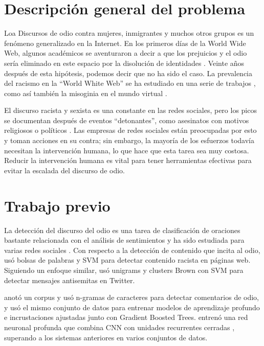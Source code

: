 \section{Descripción general del problema}

Loa Discursos de odio contra mujeres, inmigrantes y muchos otros grupos es un fenómeno generalizado en la Internet. En los primeros días de la World Wide Web, algunos académicos se aventuraron a decir a que los prejuicios y el odio sería eliminado en este espacio por la disolución de identidades \cite{levy2001cyberculture, rheingold1993virtual}. Veinte años después de esta hipótesis, podemos
decir que no ha sido el caso. La prevalencia del racismo en la ``World White Web'' se ha estudiado en una serie de trabajos \cite{adams2005white, kettrey2014staking}, como así también la misoginia en el mundo virtual \cite{filipovic2007blogging, mantilla2013gendertrolling}.

El discurso racista y sexista es una constante en las redes sociales, pero los picos se documentan después de eventos ``detonantes'', como asesinatos con motivos religiosos o políticos \cite{burnap2015cyber}. Las empresas de redes sociales están preocupadas por esto y toman acciones en su contra; sin embargo, la mayoría de los esfuerzos todavía necesitan la intervención humana, lo que hace que esta tarea sea muy costosa. Reducir la intervención humana es vital para tener herramientas efectivas para evitar la escalada del discurso de odio.

\section{Trabajo previo}

La detección del discurso del odio es una tarea de clasificación de oraciones bastante relacionada con el análisis de sentimientos y ha sido estudiada para varias redes sociales \cite{thelwall2008social, pak2010twitter, saleem2017web}. Con respecto a la detección de contenido que incita al odio, \citet{greevy2004classifying} usó bolsas de palabras y SVM para detectar contenido racista en páginas web. Siguiendo un enfoque similar, \citet{warner2012detecting} usó unigrams y clusters Brown con SVM para detectar mensajes antisemitas en Twitter.

\citet{waseem2016hateful} anotó un corpus y usó n-gramas de caracteres para detectar comentarios de odio, y \citet{badjatiya2017deep} usó el mismo conjunto de datos para entrenar modelos de aprendizaje profundo e incrustaciones ajustadas junto con Gradient Boosted Trees. \citet {zhang2018detecting} entrenó una red neuronal profunda que combina CNN con unidades recurrentes cerradas \cite{cho2014learning}, superando a los sistemas anteriores en varios conjuntos de datos.


